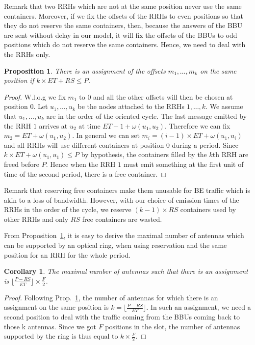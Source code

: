 \documentclass[10pt, conference, letterpaper]{IEEEtran}
\newtheorem{prop}{Proposition}
\newtheorem{corollary}{Corollary}
\begin{document}
 
Remark that two RRHs which are not at the same position never use the same containers. Moreover, if we fix the offsets of the RRHs to even positions so that they do not reserve the same containers, then, because the answers of the BBU are sent without delay in our model, it will fix the offsets of the BBUs to odd positions which do not reserve the same containers. Hence, we need to deal with the RRHs only.


\begin{prop}
\label{prop:assign}
There is an assignment of the offsets $m_1, \dots, m_k$ on the same position if  $k\times ET + RS \leq P$.
\end{prop}
\begin{proof}
 W.l.o.g we fix $m_1$ to $0$ and all the other offsets will then be chosen at position $0$.  Let $u_1,\dots,u_k$ be the nodes attached to the RRHs $1,\dots,k$. We assume that $u_1,\dots,u_k$ are in the order of the oriented cycle. The last message emitted by the RRH $1$ arrives at $u_2$ at time $ET - 1 + \omega(u_1,u_2)$. Therefore we can fix $m_2 =  ET  + \omega(u_1,u_2)$. In general we can set $m_i = (i-1) \times ET + \omega(u_1,u_i)$ and all RRHs will use different containers at position $0$ during a period. Since $k \times ET + \omega(u_1,u_1) \leq P$ by hypothesis,
 the containers filled by the $k$th RRH are freed before $P$. Hence when the RRH $1$ must emit something at the first unit of time of the second period, there is a free container.
\end{proof}

Remark that reserving free containers make them unusable for BE traffic which is akin to a loss of bandwidth. However, with our choice of emission times of the RRHs in the order of the cycle, we reserve $ (k-1)\times RS$ containers used by other RRHs and only $RS$ free containers are wasted.

From Proposition~\ref{prop:assign}, it is easy to derive the maximal number of antennas which can be supported by an optical ring, when using reservation and the same position for an RRH for the whole period.

\begin{corollary}
The maximal number of antennas such that there is an assignment is $ \lfloor\frac{P- RS}{ET}\rfloor \times \frac{F}{2}$.
\end{corollary}
\begin{proof}
Following Prop.~\ref{prop:assign}, the number of antennas for which there is an assignment on the same position is $k = \lfloor\frac{P- RS}{ET}\rfloor $.
In such an assignment, we need a second position to deal with the traffic coming from the BBUs coming back to those k antennas. Since we got  $F$ positions in the slot, the number of antennas supported by the ring is thus equal to $k \times \frac{F}{2}$.
\end{proof}
\end{document}
